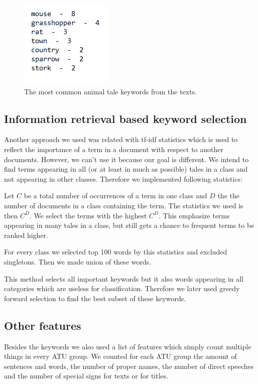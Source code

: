 \documentclass[a4paper]{article}
\begin{document}
\begin{figure}[h]
\centering
\includegraphics[]{random/sortedtitlekeywords.PNG}
\caption{The most common animal tale keywords from the texts.}
\label{fig:sortart}
\end{figure}


\subsection{Information retrieval based keyword selection}

Another approach we used was related with tf-idf statistics which is used
to reflect the importance of a term in a document with respect to another
documents. However, we can't use it because our goal is different. We
intend to find terms appearing in all (or at least in much as possible)
tales in a class and not appearing in other classes. Therefore we
implemented following statistics: 

Let $C$ be a total number
of occurrences of a term in one class and $D$ the the number of
documents in a class containing the term. The statistics we used is then  
$C^D$. We select the terms with the highest $C^D$. This emphasize terms
appearing in many tales in a class, but still gets a chance to frequent
terms to be ranked higher.

For every class we selected top 100 words by this statistics and excluded
singletons. Then we made union of these words. 

This method selects all important keywords but it also
words appearing in all categories which are useless for classification.
Therefore we later used greedy forward selection to find the best subset of
these keywords.


\subsection{Other features}

Besides the keywords we also used a list of features which simply
count multiple things in every ATU group.
We counted for each ATU group the amount of sentences and words, the number of proper names, the number of direct speeches and the number of special signs for texts or for titles. %
\end{document}
